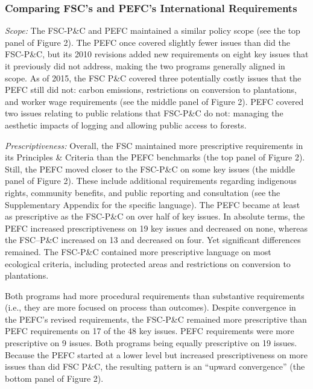 \documentclass[
      12pt,
            Review ]{article}
\begin{document}
\hypertarget{comparing-fscs-and-pefcs-international-requirements}{%
\subsubsection{Comparing FSC's and PEFC's International Requirements}\label{comparing-fscs-and-pefcs-international-requirements}}

\emph{Scope:} The FSC-P\&C and PEFC maintained a similar policy scope (see the top panel of Figure 2). The PEFC once covered slightly fewer issues than did the FSC-P\&C, but its 2010 revisions added new requirements on eight key issues that it previously did not address, making the two programs generally aligned in scope. As of 2015, the FSC P\&C covered three potentially costly issues that the PEFC still did not: carbon emissions, restrictions on conversion to plantations, and worker wage requirements (see the middle panel of Figure 2). PEFC covered two issues relating to public relations that FSC-P\&C do not: managing the aesthetic impacts of logging and allowing public access to forests.

\emph{Prescriptiveness:} Overall, the FSC maintained more prescriptive requirements in its Principles \& Criteria than the PEFC benchmarks (the top panel of Figure 2). Still, the PEFC moved closer to the FSC-P\&C on some key issues (the middle panel of Figure 2). These include additional requirements regarding indigenous rights, community benefits, and public reporting and consultation (see the Supplementary Appendix for the specific language). The PEFC became at least as prescriptive as the FSC-P\&C on over half of key issues. In absolute terms, the PEFC increased prescriptiveness on 19 key issues and decreased on none, whereas the FSC--P\&C increased on 13 and decreased on four. Yet significant differences remained. The FSC-P\&C contained more prescriptive language on most ecological criteria, including protected areas and restrictions on conversion to plantations.

Both programs had more procedural requirements than substantive requirements (i.e., they are more focused on process than outcomes). Despite convergence in the PEFC's revised requirements, the FSC-P\&C remained more prescriptive than PEFC requirements on 17 of the 48 key issues. PEFC requirements were more prescriptive on 9 issues. Both programs being equally prescriptive on 19 issues. Because the PEFC started at a lower level but increased prescriptiveness on more issues than did FSC P\&C, the resulting pattern is an ``upward convergence'' (the bottom panel of Figure 2).
\end{document}

